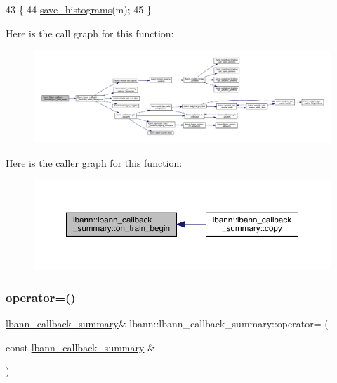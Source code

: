 \begin{DoxyCode}
43                                                     \{
44   \hyperlink{classlbann_1_1lbann__callback__summary_a72a46c51527a02516584ce1e49e5cd29}{save\_histograms}(m);
45 \}
\end{DoxyCode}
Here is the call graph for this function\+:\nopagebreak
\begin{figure}[H]
\begin{center}
\leavevmode
\includegraphics[width=350pt]{classlbann_1_1lbann__callback__summary_a1ff0c4368aee47c294b9c11a5176b9e0_cgraph}
\end{center}
\end{figure}
Here is the caller graph for this function\+:\nopagebreak
\begin{figure}[H]
\begin{center}
\leavevmode
\includegraphics[width=350pt]{classlbann_1_1lbann__callback__summary_a1ff0c4368aee47c294b9c11a5176b9e0_icgraph}
\end{center}
\end{figure}
\mbox{\label{classlbann_1_1lbann__callback__summary_a4e2c3d2fcb09c5dc00035be86441ad53}} 
\subsubsection{\texorpdfstring{operator=()}{operator=()}}
{\footnotesize\ttfamily \hyperlink{classlbann_1_1lbann__callback__summary}{lbann\+\_\+callback\+\_\+summary}\& lbann\+::lbann\+\_\+callback\+\_\+summary\+::operator= (\begin{DoxyParamCaption}\item[{const \hyperlink{classlbann_1_1lbann__callback__summary}{lbann\+\_\+callback\+\_\+summary} \&}]{ }\end{DoxyParamCaption})\hspace{0.3cm}{\ttfamily [default]}}

